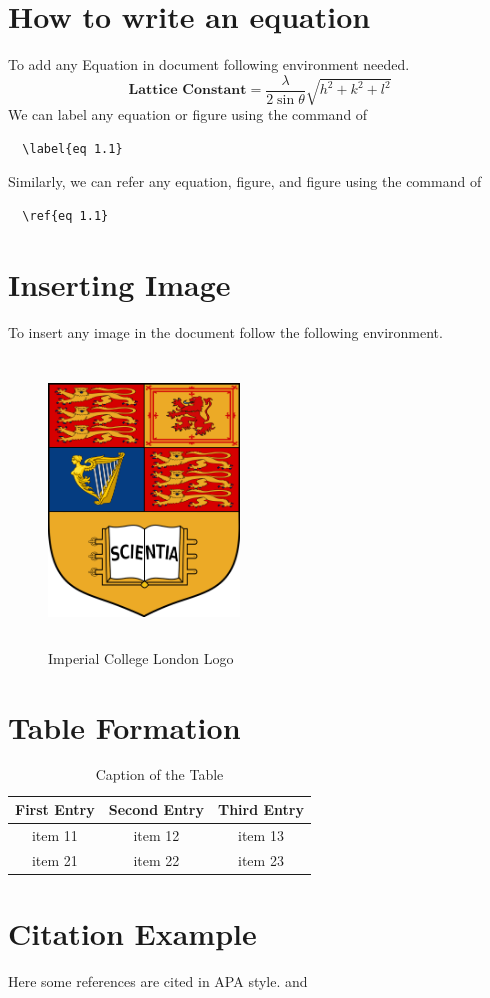 \section{How to write an equation}
To add any Equation in document following environment needed.
\begin{equation}
    \textbf{Lattice Constant} =\frac{\lambda}{2\sin{\theta}}\sqrt{h^2+k^2+l^2}
    \label{eq 1.1}
\end{equation}
We can label any equation or figure using the command of  \begin{verbatim}
  \label{eq 1.1}
\end{verbatim}
Similarly, we can refer any equation, figure, and figure using the command of\begin{verbatim}
  \ref{eq 1.1}
\end{verbatim}


\section{Inserting Image}
To insert any image in the document follow the following environment.
\begin{figure}[hbt!]
    \centering
    \includegraphics[width=2in,height=3in]{images/icl_crest}
    \caption{Imperial College London Logo}
    \label{fig:my_label}
\end{figure}


\section{Table Formation}
\begin{table}[hbt!]
    \centering
    \caption{Caption of the Table}
    \begin{tabular}{ccc}
        \hline
        First Entry & Second Entry & Third Entry \\
        \hline
        item 11     & item 12      & item 13     \\
        item 21     & item 22      & item 23     \\
        \hline
    \end{tabular}
    \label{tab 1.1}
\end{table}


\section{Citation Example}
\hspace{4em}
Here some references are cited in APA style. \cite{vellacheri2014high} and \cite{asaithambi2021synthesis}
